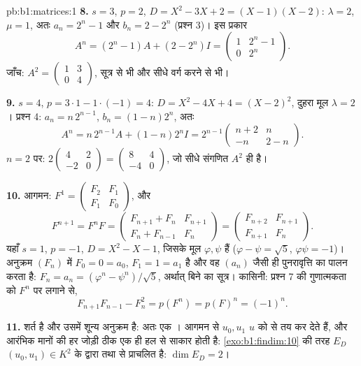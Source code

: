 \begin{solution}{pb:b1:matrices:1}
\textbf{8.} $s = 3$, $p = 2$, $D = X^2 - 3X + 2 = (X - 1)(X - 2)$: $\lambda
= 2$, $\mu = 1$, अतः $a_n = 2^n - 1$ और $b_n = 2 - 2^n$ (प्रश्न 3)। इस
प्रकार
\[
A^n = (2^n - 1)A + (2 - 2^n)I
= \begin{pmatrix} 1 & 2^n - 1\\ 0 & 2^n \end{pmatrix}.
\]
जाँच: $A^2 = \begin{pmatrix} 1 & 3\\ 0 & 4\end{pmatrix}$, सूत्र से भी और
सीधे वर्ग करने से भी।

\textbf{9.} $s = 4$, $p = 3\cdot1 - 1\cdot(-1) = 4$: $D = X^2 - 4X + 4 = (X
- 2)^2$, दुहरा मूल $\lambda = 2$। प्रश्न 4: $a_n = n\,2^{n-1}$, $b_n = (1 -
n)2^n$, अतः
\[
A^n = n\,2^{n-1}A + (1 - n)2^n I
= 2^{n-1}\begin{pmatrix} n + 2 & n\\ -n & 2 - n
\end{pmatrix}.
\]
$n = 2$ पर: $2\begin{pmatrix} 4 & 2\\ -2 & 0\end{pmatrix} = \begin{pmatrix}
8 & 4\\ -4 & 0 \end{pmatrix}$, जो सीधे संगणित $A^2$ ही है।

\textbf{10.} आगमन: $F^1 = \begin{pmatrix} F_2 & F_1\\ F_1 &
F_0\end{pmatrix}$, और
\[
F^{n+1} = F^n F =
\begin{pmatrix} F_{n+1} + F_n & F_{n+1}\\
F_n + F_{n-1} & F_n \end{pmatrix}
= \begin{pmatrix} F_{n+2} & F_{n+1}\\ F_{n+1} & F_n
\end{pmatrix}.
\]
यहाँ $s = 1$, $p = -1$, $D = X^2 - X - 1$, जिसके मूल $\varphi, \psi$ हैं
($\varphi - \psi = \sqrt5$, $\varphi\psi = -1$)। अनुक्रम $(F_n)$ में $F_0 =
0 = a_0$, $F_1 = 1 = a_1$ है और वह $(a_n)$ जैसी ही पुनरावृत्ति का पालन करता
है: $F_n = a_n = (\varphi^n - \psi^n)/\sqrt5$, अर्थात् बिने का सूत्र।
कासिनी: प्रश्न 7 की गुणात्मकता को $F^n$ पर लगाने से,
\[
F_{n+1}F_{n-1} - F_n^2 = p(F^n) = p(F)^n = (-1)^n .
\]

\textbf{11.} शर्त  है और उसमें शून्य अनुक्रम है: अतः एक । आगमन
से $u_0, u_1$ $u$ को  से तय कर देते हैं, और आरंभिक मानों की हर
जोड़ी ठीक एक ही हल से साकार होती है: \cref{exo:b1:findim:10} की तरह $E_D$
$(u_0, u_1) \in K^2$ के द्वारा  तथा  से प्राचलित है:
$\dim E_D = 2$।


\end{solution}
